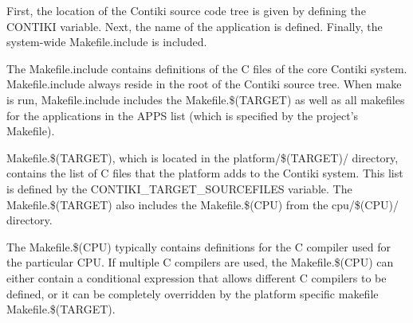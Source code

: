 

\-First, the location of the \-Contiki source code tree is given by defining the {\ttfamily \-C\-O\-N\-T\-I\-K\-I} variable. \-Next, the name of the application is defined. \-Finally, the system-\/wide {\ttfamily \-Makefile.\-include} is included.

\-The {\ttfamily \-Makefile.\-include} contains definitions of the \-C files of the core \-Contiki system. {\ttfamily \-Makefile.\-include} always reside in the root of the \-Contiki source tree. \-When {\ttfamily make} is run, {\ttfamily \-Makefile.\-include} includes the {\ttfamily \-Makefile.\$(\-T\-A\-R\-G\-E\-T)} as well as all makefiles for the applications in the {\ttfamily \-A\-P\-P\-S} list (which is specified by the project's {\ttfamily \-Makefile}).

{\ttfamily \-Makefile.\$(\-T\-A\-R\-G\-E\-T)}, which is located in the platform/\$(\-T\-A\-R\-G\-E\-T)/ directory, contains the list of \-C files that the platform adds to the \-Contiki system. \-This list is defined by the {\ttfamily \-C\-O\-N\-T\-I\-K\-I\-\_\-\-T\-A\-R\-G\-E\-T\-\_\-\-S\-O\-U\-R\-C\-E\-F\-I\-L\-E\-S} variable. \-The {\ttfamily \-Makefile.\$(\-T\-A\-R\-G\-E\-T)} also includes the {\ttfamily \-Makefile.\$(\-C\-P\-U)} from the cpu/\$(\-C\-P\-U)/ directory.

\-The {\ttfamily \-Makefile.\$(\-C\-P\-U)} typically contains definitions for the \-C compiler used for the particular \-C\-P\-U. \-If multiple \-C compilers are used, the {\ttfamily \-Makefile.\$(\-C\-P\-U)} can either contain a conditional expression that allows different \-C compilers to be defined, or it can be completely overridden by the platform specific makefile {\ttfamily \-Makefile.\$(\-T\-A\-R\-G\-E\-T)}. 